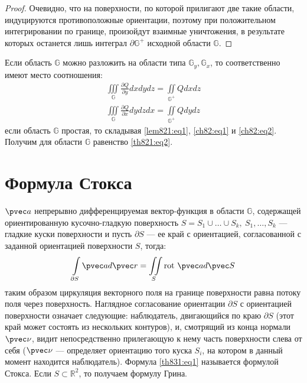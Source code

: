 \begin{proof}
  Очевидно, что на поверхности, по которой прилигают две такие области,
  индуцируются противоположные ориентации, поэтому при положительном
  интегрировании по границе, произойдут взаимные уничтожения, в результате
  которых останется лишь интеграл $\partial \mathbb{G}^+$ исходной области
  $\mathbb{G}$.
\end{proof}

Если область $\mathbb{G}$ можно разложить на области типа $\mathbb{G}_y,
\mathbb{G}_x$, то соответственно имеют место соотношения:
\begin{gather}
  \iiint\limits_{\mathbb{G}} \frac{\partial Q}{\partial y} dx dy dz =
  \iint\limits_{\mathbb{G}^+} Q dx dz
  \label{ch82:eq1} \\
  \iiint\limits_{\mathbb{G}} \frac{\partial Q}{\partial x} dy dz dx =
  \iint\limits_{\mathbb{G}^+} Q dy dz
  \label{ch82:eq2}
\end{gather}
если область $\mathbb{G}$ простая, то складывая \eqref{lem821:eq1},
\eqref{ch82:eq1} и \eqref{ch82:eq2}. Получим для области $\mathbb{G}$ равенство
\eqref{th821:eq2}.

\section{Формула Стокса}
\begin{theorem}
  $\pvec a$ непрерывно дифференцируемая вектор-функция в области $\mathbb{G}$,
  содержащей ориентированную кусочно-гладкую поверхность $S = S_1 \cup \dots
  \cup S_k, \ S_1, \dots, S_k$ --- гладкие куски поверхности и пусть $\partial
  S$ --- ее край с ориентацией, согласованной с заданной ориентацией
  поверхности $S$, тогда:
  \begin{gather}
    \int\limits_{\partial S} \pvec a d \pvec r = \iint\limits_S \mbox{rot} \
    \pvec a d \pvec S
    \label{th831:eq1}
  \end{gather}
  таким образом циркуляция векторного поля на границе поверхности равна потоку
  поля через поверхность. Наглядное согласование ориентации $\partial S$ с
  ориентацией поверхности означает следующие: наблюдатель, двигающийся по краю
  $\partial S$ (этот край может состоять из нескольких контуров), и, смотрящий
  из конца нормали $\pvec \nu$, видит непосредственно прилегающую к нему часть
  поверхности слева от себя ($\pvec \nu$ --- определяет ориентацию того куска
  $S_i$, на котором в данный момент находится наблюдатель). Формула
  \eqref{th831:eq1} называется формулой Стокса. Если $S \subset \mathbb{R}^2$,
  то получаем формулу Грина.
\end{theorem}

